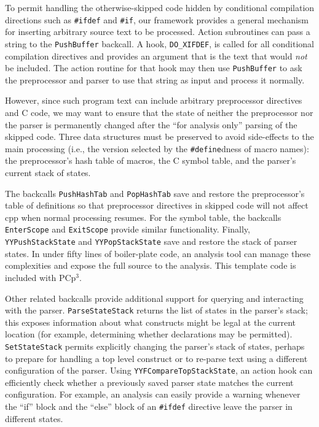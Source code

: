 \documentclass{article}
\newcommand{\pcp}{\mbox{\textsf{PCp}$^3$}}
\newcommand{\Cpp}{\mbox{\textsf{cpp}}}
\newcommand{\C}{\mbox{C}}
\newcommand{\ppd}[1]{\texttt{\##1}}
\newcommand{\ie}{i.e.,}
\begin{document}
To permit handling the otherwise-skipped code hidden by conditional
compilation directions such as \ppd{ifdef} and \ppd{if}, our framework
provides a general mechanism for inserting arbitrary source text to be
processed.  Action subroutines can pass a string to the \texttt{PushBuffer}
backcall.  A hook, \texttt{DO\_XIFDEF}, is called for all conditional
compilation directives and provides an argument that is the text that
would \emph{not} be included.  The action routine for that hook may then
use \texttt{PushBuffer} to ask the preprocessor and parser to use that
string as input and process it normally.

However, since such program text can include arbitrary preprocessor
directives and \C{} code, we may want to ensure that the state of
neither the preprocessor nor the parser is permanently changed after the
``for analysis only'' parsing of the skipped code.  Three data
structures must be preserved to avoid side-effects to the main
processing (\ie{} the version selected by the \ppd{define}dness of macro
names): the preprocessor's hash table of macros, the \C{} symbol table,
and the parser's current stack of states.  

The backcalls \texttt{PushHashTab} and \texttt{PopHashTab} save and
restore the preprocessor's table of definitions so that preprocessor
directives in skipped code will not affect \Cpp{} when normal processing
resumes.  For the symbol table, the backcalls \texttt{EnterScope} and
\texttt{ExitScope} provide similar functionality.  Finally,
\texttt{YYPushStackState} and \texttt{YYPopStackState} save and restore
the stack of parser states.  In under fifty lines of boiler-plate code,
an analysis tool can manage these complexities and expose the full source to
the analysis.  This template code is included with \pcp{}.

Other related backcalls provide additional support for querying and
interacting with the parser.  \texttt{ParseStateStack} returns the
list of states in the parser's stack; this exposes information about what
constructs might be legal at the current location (for example,
determining whether declarations may be permitted).
\texttt{SetStateStack} permits explicitly changing the parser's stack
of states, perhaps to prepare for handling a top level construct or to
re-parse text using a different configuration of the parser.  Using
\texttt{YYFCompareTopStackState}, an action hook can efficiently check
whether a previously saved parser state matches the current
configuration.  For example, an analysis can easily provide a warning
whenever the ``if'' block and the ``else'' block of an \ppd{ifdef}
directive leave the parser in different states.
\end{document}
